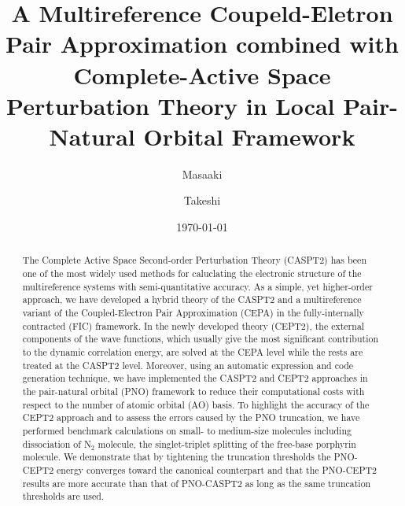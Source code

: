 \documentclass[aip,jcp,amsmath]{revtex4-1}
\begin{document}
\title{\color{blue}
  A Multireference Coupeld-Eletron Pair Approximation combined with Complete-Active Space Perturbation Theory in Local Pair-Natural Orbital Framework}
\date{\today}
\author{Masaaki }

\author{Takeshi }

\begin{abstract}  
  The Complete Active Space Second-order Perturbation Theory (CASPT2) has been one of the most widely used methods for caluclating the electronic structure of the multireference systems with semi-quantitative accuracy.
  As a simple, yet higher-order approach, we have developed a hybrid theory of the CASPT2 and a multireference variant of the Coupled-Electron Pair Approximation (CEPA) in the fully-internally contracted (FIC) framework.
  In the newly developed theory (CEPT2), the external components of the wave functions, which usually give the most significant contribution to the dynamic correlation energy, are solved at the CEPA level while the rests are treated at the CASPT2 level.
  Moreover, using an automatic expression and code generation technique, we have implemented the CASPT2 and CEPT2 approaches in the pair-natural orbital (PNO) framework to reduce their computational costs with respect to the number of atomic orbital (AO) basis.
  To highlight the accuracy of the CEPT2 approach and to assess the errors caused by the PNO truncation, we have performed benchmark calculations on small- to medium-size molecules including dissociation of N${}_2$ molecule, the singlet-triplet splitting of the free-base porphyrin molecule.
  We demonstrate that by tightening the truncation thresholds the PNO-CEPT2 energy converges toward the canonical counterpart and that the PNO-CEPT2 results are more accurate than that of PNO-CASPT2 as long as the same truncation thresholds are used.
  
\end{abstract}

\maketitle
\end{document}
